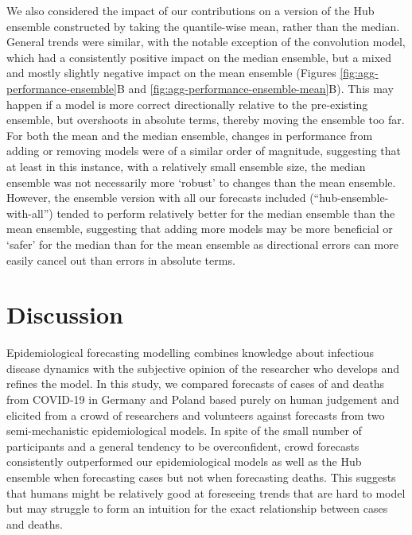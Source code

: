 \documentclass[
]{article}
\begin{document}
We also considered the impact of our contributions on a version of the Hub ensemble constructed by taking the quantile-wise mean, rather than the median.
General trends were similar, with the notable exception of the convolution model, which had a consistently positive impact on the median ensemble, but a mixed and mostly slightly negative impact on the mean ensemble (Figures \ref{fig:agg-performance-ensemble}B and \ref{fig:agg-performance-ensemble-mean}B). This may happen if a model is more correct directionally relative to the pre-existing ensemble, but overshoots in absolute terms, thereby moving the ensemble too far. For both the mean and the median ensemble, changes in performance from adding or removing models were of a similar order of magnitude, suggesting that at least in this instance, with a relatively small ensemble size, the median ensemble was not necessarily more `robust' to changes than the mean ensemble. However, the ensemble version with all our forecasts included (``hub-ensemble-with-all'') tended to perform relatively better for the median ensemble than the mean ensemble, suggesting that adding more models may be more beneficial or `safer' for the median than for the mean ensemble as directional errors can more easily cancel out than errors in absolute terms.

\hypertarget{discussion}{%
\section{Discussion}\label{discussion}}

Epidemiological forecasting modelling combines knowledge about infectious disease dynamics with the subjective opinion of the researcher who develops and refines the model. In this study, we compared forecasts of cases of and deaths from COVID-19 in Germany and Poland based purely on human judgement and elicited from a crowd of researchers and volunteers against forecasts from two semi-mechanistic epidemiological models. In spite of the small number of participants and a general tendency to be overconfident, crowd forecasts consistently outperformed our epidemiological models as well as the Hub ensemble when forecasting cases but not when forecasting deaths. This suggests that humans might be relatively good at foreseeing trends that are hard to model but may struggle to form an intuition for the exact relationship between cases and deaths.
\end{document}
